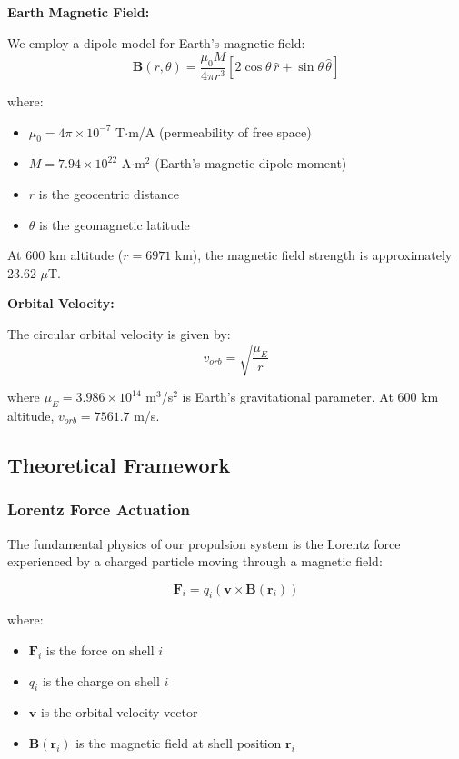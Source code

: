 \documentclass[12pt,a4paper]{article}
\begin{document}
\textbf{Earth Magnetic Field:}

We employ a dipole model for Earth's magnetic field:
\begin{equation}
\mathbf{B}(r, \theta) = \frac{\mu_0 M}{4\pi r^3} [2\cos\theta\, \hat{r} + \sin\theta\, \hat{\theta}]
\label{eq:dipole}
\end{equation}

where:
\begin{itemize}
\item $\mu_0 = 4\pi \times 10^{-7}$ T$\cdot$m/A (permeability of free space)
\item $M = 7.94 \times 10^{22}$ A$\cdot$m$^2$ (Earth's magnetic dipole moment)
\item $r$ is the geocentric distance
\item $\theta$ is the geomagnetic latitude
\end{itemize}

At 600 km altitude ($r = 6971$ km), the magnetic field strength is approximately 23.62 $\mu$T.

\textbf{Orbital Velocity:}

The circular orbital velocity is given by:
\begin{equation}
v_{orb} = \sqrt{\frac{\mu_E}{r}}
\label{eq:orbital_velocity}
\end{equation}

where $\mu_E = 3.986 \times 10^{14}$ m$^3$/s$^2$ is Earth's gravitational parameter. At 600 km altitude, $v_{orb} = 7561.7$ m/s.

\subsection{Theoretical Framework}

\subsubsection{Lorentz Force Actuation}

The fundamental physics of our propulsion system is the Lorentz force experienced by a charged particle moving through a magnetic field:

\begin{equation}
\mathbf{F}_i = q_i (\mathbf{v} \times \mathbf{B}(\mathbf{r}_i))
\label{eq:lorentz_force}
\end{equation}

where:
\begin{itemize}
\item $\mathbf{F}_i$ is the force on shell $i$
\item $q_i$ is the charge on shell $i$
\item $\mathbf{v}$ is the orbital velocity vector
\item $\mathbf{B}(\mathbf{r}_i)$ is the magnetic field at shell position $\mathbf{r}_i$
\end{itemize}
\end{document}

